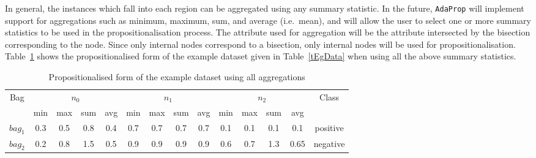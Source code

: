 \documentclass[a4paper,12pt]{article} %
\newcommand{\AdaProp}{\texttt{AdaProp}\xspace}
\begin{document}
In general, 
    the instances which fall into each region  
    can be aggregated using any summary statistic.
In the future, \AdaProp will implement support for aggregations such as 
    minimum, maximum, sum, and average (i.e.\ mean), 
    and will allow the user to select one or more summary statistics
    to be used in the propositionalisation process.
The attribute used for aggregation will be the attribute intersected
    by the bisection corresponding to the node.
Since only internal nodes correspond to a bisection, 
    only internal nodes will be used for propositionalisation.
Table~\ref{tEgPropAgg} shows the propositionalised form of 
    the example dataset given in Table~\ref{tEgData} when
    using all the above summary statistics.   
    
\begin{table}
\begin{center}
\begin{tabular}{*{14}{c}}
    \toprule
        \multirow{2}{*}{Bag} & 
        \multicolumn{4}{c}{$n_0$} & 
        \multicolumn{4}{c}{$n_1$} & 
        \multicolumn{4}{c}{$n_2$} &
        \multirow{2}{*}{Class} \\
    \cmidrule(r){2-5}
    \cmidrule(r){6-9}
    \cmidrule(r){10-13}
     & min & max & sum & avg & min & max & sum & avg & min & max & sum & avg & \\
    \midrule
    $bag_1$ &     0.3 & 0.5 & 0.8 & 0.4     & 0.7 & 0.7 & 0.7 & 0.7     & 0.1 & 0.1 & 0.1 & 0.1 & positive\\
    $bag_2$ &     0.2 & 0.8 & 1.5 & 0.5     & 0.9 & 0.9 & 0.9 & 0.9     & 0.6 & 0.7 & 1.3 & 0.65 & negative\\
    \bottomrule
    
\end{tabular}
\end{center}
\caption{Propositionalised form of the example dataset using all aggregations}
\label{tEgPropAgg}
\end{table}    
\end{document}
